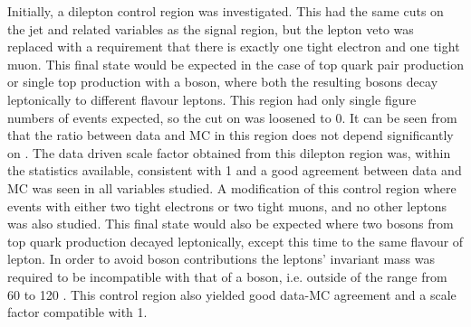 Initially, a dilepton control region was investigated. This had the same cuts on the jet and \MET related variables as the signal region, but the lepton veto was replaced with a requirement that there is exactly one tight electron and one tight muon. This final state would be expected in the case of top quark pair production or single top production with a \PW boson, where both the resulting \PW bosons decay leptonically to different flavour leptons. This region had only single figure numbers of events expected, so the cut on \jetmetdphi was loosened to 0. It can be seen from  that the ratio between data and MC in this region does not depend significantly on \jetmetdphi. The data driven scale factor obtained from this dilepton region was, within the statistics available, consistent with 1 and a good agreement between data and \ac{MC} was seen in all variables studied. A modification of this control region where events with either two tight electrons or two tight muons, and no other leptons was also studied. This final state would also be expected where two \PW bosons from top quark production decayed leptonically, except this time to the same flavour of lepton. In order to avoid \PZ boson contributions the leptons' invariant mass was required to be incompatible with that of a \PZ boson, i.e. outside of the range from 60 to 120 \GeV. This control region also yielded good data-\ac{MC} agreement and a scale factor compatible with 1. 

